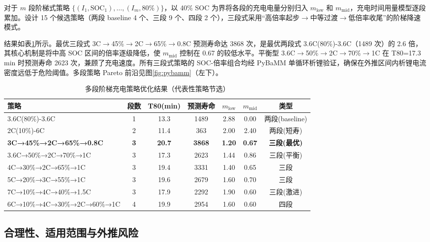 \documentclass[withoutpreface]{cumcmthesis}
\begin{document}
对于 $m$ 段阶梯式策略 $\{(I_1, \mathrm{SOC}_1), \ldots, (I_m, 80\%)\}$，以 40\% SOC 为界将各段的充电电量分别归入 $m_{\mathrm{low}}$ 和 $m_{\mathrm{mid}}$，充电时间用量模型逐段累加。设计 15 个候选策略（两段 baseline 4 个、三段 9 个、四段 2 个），三段式采用``高倍率起步$\rightarrow$中等过渡$\rightarrow$低倍率收尾''的阶梯降速模式。

结果如表\ref{tab:multistage}所示。最优三段式 3C$\rightarrow$45\%$\rightarrow$2C$\rightarrow$65\%$\rightarrow$0.8C 预测寿命达 3868 次，是最优两段式 3.6C(80\%)-3.6C（1489 次）的 2.6 倍，其核心机制是将中高 SOC 区间的倍率逐级降低，使 $m_{\mathrm{mid}}$ 控制在 0.67 的较低水平。平衡型 3.6C$\rightarrow$50\%$\rightarrow$2C$\rightarrow$70\%$\rightarrow$1C 在 T80=17.3 min 时预测寿命 2623 次，兼顾了充电速度。所有三段式策略的 SOC-倍率组合均经 PyBaMM 单循环析锂验证，确保在外推区间内析锂电流密度远低于危险阈值。多段策略 Pareto 前沿见图\ref{fig:pybamm}（左下）。

\begin{table}[htbp]
\centering
\caption{多段阶梯充电策略优化结果（代表性策略节选）}
\label{tab:multistage}
\begin{tabular}{lcccccc}
\toprule
策略 & 段数 & T80(min) & 预测寿命 & $m_{\mathrm{low}}$ & $m_{\mathrm{mid}}$ & 类型 \\
\midrule
3.6C(80\%)-3.6C & 1 & 13.3 & 1489 & 2.88 & 0.00 & 两段(baseline) \\
2C(10\%)-6C & 2 & 11.4 & 363 & 2.00 & 2.40 & 两段(短寿) \\
\midrule
\textbf{3C→45\%→2C→65\%→0.8C} & \textbf{3} & \textbf{20.7} & \textbf{3868} & \textbf{1.20} & \textbf{0.67} & \textbf{三段(最优)} \\
3.6C→50\%→2C→70\%→1C & 3 & 17.3 & 2623 & 1.44 & 0.86 & 三段(平衡) \\
4C→30\%→2C→65\%→1C & 3 & 19.4 & 3331 & 1.40 & 0.65 & 三段 \\
5C→20\%→3C→55\%→1C & 3 & 19.6 & 2679 & 1.60 & 0.70 & 三段 \\
7C→10\%→4C→40\%→1.5C & 3 & 17.9 & 2292 & 1.90 & 0.60 & 三段(激进) \\
\midrule
6C→10\%→4C→30\%→2C→60\%→1C & 4 & 19.9 & 2954 & 1.60 & 0.60 & 四段 \\
\bottomrule
\end{tabular}
\end{table}

\subsection{合理性、适用范围与外推风险}
\end{document}
